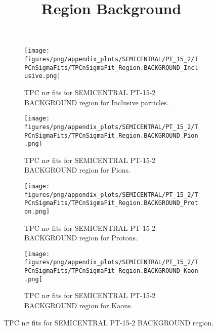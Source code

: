             \begin{figure}[H]
                \title{Region Background}
                \begin{subfigure}[b]{0.5\textwidth}
                    \centering
                    \texttt{[image: figures/png/appendix\_plots/SEMICENTRAL/PT\_15\_2/TPCnSigmaFits/TPCnSigmaFit\_Region.BACKGROUND\_Inclusive.png]}
                    \caption{TPC n$\sigma$ fits for SEMICENTRAL PT-15-2 BACKGROUND region for Inclusive particles.}
                    \label{fig:appendix_SEMICENTRAL_PT-15-2_BACKGROUND_Inclusive}
                \end{subfigure}
                \begin{subfigure}[b]{0.5\textwidth}
                    \centering
                    \texttt{[image: figures/png/appendix\_plots/SEMICENTRAL/PT\_15\_2/TPCnSigmaFits/TPCnSigmaFit\_Region.BACKGROUND\_Pion.png]}
                    \caption{TPC n$\sigma$ fits for SEMICENTRAL PT-15-2 BACKGROUND region for Pions.}
                    \label{fig:appendix_SEMICENTRAL_PT-15-2_BACKGROUND_Pion}
                \end{subfigure}
                \begin{subfigure}[b]{0.5\textwidth}
                    \centering
                    \texttt{[image: figures/png/appendix\_plots/SEMICENTRAL/PT\_15\_2/TPCnSigmaFits/TPCnSigmaFit\_Region.BACKGROUND\_Proton.png]}
                    \caption{TPC n$\sigma$ fits for SEMICENTRAL PT-15-2 BACKGROUND region for Protons.}
                    \label{fig:appendix_SEMICENTRAL_PT-15-2_BACKGROUND_Proton}
                \end{subfigure}
                \begin{subfigure}[b]{0.5\textwidth}
                    \centering
                    \texttt{[image: figures/png/appendix\_plots/SEMICENTRAL/PT\_15\_2/TPCnSigmaFits/TPCnSigmaFit\_Region.BACKGROUND\_Kaon.png]}
                    \caption{TPC n$\sigma$ fits for SEMICENTRAL PT-15-2 BACKGROUND region for Kaons.}
                    \label{fig:appendix_SEMICENTRAL_PT-15-2_BACKGROUND_Kaon}
                \end{subfigure}
                \caption{TPC n$\sigma$ fits for SEMICENTRAL PT-15-2 BACKGROUND region.}
                \label{fig:appendix_SEMICENTRAL_PT-15-2_BACKGROUND}
            \end{figure}
            \clearpage
            
    
